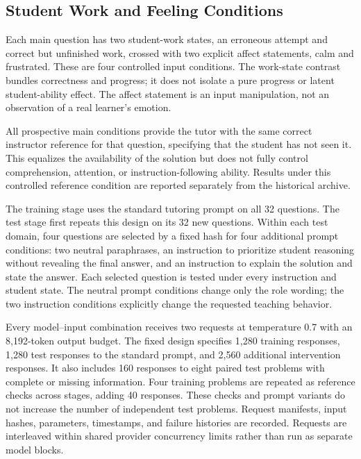 \subsection{Student Work and Feeling Conditions}

Each main question has two student-work states, an erroneous attempt and correct
but unfinished work, crossed with two explicit affect statements, calm and
frustrated. These are four controlled input conditions. The work-state contrast
bundles correctness and progress; it does not isolate a pure progress or latent
student-ability effect. The affect statement is an input manipulation, not an
observation of a real learner's emotion.

All prospective main conditions provide the tutor with the same correct
instructor reference for that question, specifying that the student has not
seen it. This equalizes the availability of the solution but does not fully
control comprehension, attention, or instruction-following ability. Results
under this controlled reference condition are reported separately from the
historical archive.

The training stage uses the standard tutoring prompt on all 32 questions. The
test stage first repeats this design on its 32 new questions. Within
each test domain, four questions are selected by a fixed hash for four
additional prompt conditions: two neutral paraphrases, an instruction to prioritize
student reasoning without revealing the final answer, and an instruction to
explain the solution and state the answer. Each selected question is tested under every instruction and student state. The neutral prompt conditions change only the role wording; the two
instruction conditions explicitly change the requested teaching behavior.

Every model--input combination receives two requests at temperature 0.7 with an
8,192-token output budget. The fixed design specifies 1,280 training responses,
1,280 test responses to the standard prompt, and 2,560 additional intervention
responses. It also includes 160 responses to eight paired test problems with complete
or missing information. Four training problems are repeated as reference
checks across stages, adding 40 responses. These checks and prompt variants
do not increase the number of independent test problems. Request manifests, input hashes,
parameters, timestamps, and failure histories are recorded. Requests are
interleaved within shared provider concurrency limits rather than run as
separate model blocks.

